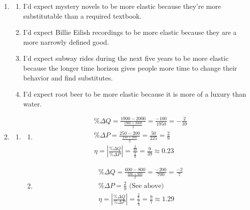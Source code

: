 \documentclass{article}
\begin{document}
\begin{enumerate}

\item

	\begin{enumerate}
	
	\item I'd expect mystery novels to be more elastic because they're more substitutable than a required textbook.
	
	\item I'd expect Billie Eilish recordings to be more elastic because they are a more narrowly defined good.
	
	\item I'd expect subway rides during the next five years to be more elastic because the longer time horizon gives people more time to change their behavior and find substitutes.
	
	\item I'd expect root beer to be more elastic because it is more of a luxury than water. 
	
	\end{enumerate}
	
\item
	
	\begin{enumerate}
	
	\item 
	
		\begin{enumerate}
		
		\item 
		\begin{gather*}
		\% \Delta Q = \frac{1900 - 2000}{\frac{1900 + 2000}{2}} = \frac{-100}{1950} = -\frac{2}{39} \\
		\% \Delta P = \frac{250 - 200}{\frac{250 + 200}{2}}  = \frac{50}{225} = \frac{2}{9} \\
		\eta = \left| \frac{\% \Delta Q}{\% \Delta P} \right| = \frac{\frac{2}{39}}{\frac{2}{9}} = \frac{9}{39} \approx 0.23
		\end{gather*}
		
		\item
		\begin{gather*}
		\% \Delta Q = \frac{600 - 800}{\frac{600 + 800}{2}} = \frac{-200}{700} = \frac{-2}{7} \\
		\% \Delta P = \frac{2}{9} \text{ (See above)} \\
		\eta = \left| \frac{\% \Delta Q}{\% \Delta P} \right| = \frac{\frac{2}{7}}{\frac{2}{9}} = \frac{9}{7} \approx 1.29
		\end{gather*}
		

\end{enumerate}
\end{enumerate}
\end{enumerate}
\end{document}
